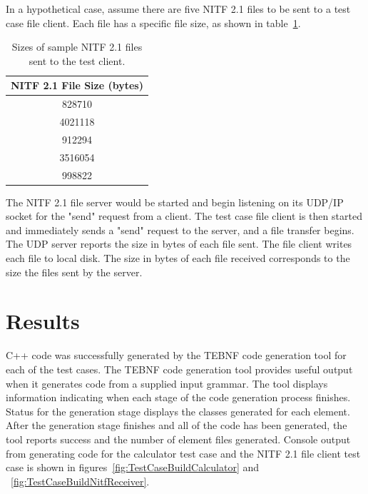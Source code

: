 \indent
In a hypothetical case, assume there are five NITF 2.1 files to be sent to a test case file client.  Each file has a specific file size, as shown in table~\ref{sampleNitfSizeServerData}.

\begin{table}[h]
\begin{center}
\caption{Sizes of sample NITF 2.1 files sent to the test client.}
\label{sampleNitfSizeServerData}
\begin{tabular}{|c|} \hline
\textbf{NITF 2.1 File Size (bytes)} \\ \hline \hline
828710 \\ \hline
4021118 \\ \hline
912294 \\ \hline
3516054 \\ \hline
998822 \\ \hline                                  
\end{tabular}
\end{center}
\end{table}

\indent
The NITF 2.1 file server would be started and begin listening on its UDP/IP socket for the "send" request from a client.  The test case file client is then started and immediately sends a "send" request to the server, and a file transfer begins.  The UDP server reports the size in bytes of each file sent.  The file client writes each file to local disk.  The size in bytes of each file received corresponds to the size the files sent by the server.

\section{Results}
C++ code was successfully generated by the TEBNF code generation tool for each of the test cases.  The TEBNF code generation tool provides useful output when it generates code from a supplied input grammar.  The tool displays information  indicating when each stage of the code generation process finishes.  Status for the generation stage displays the classes generated for each element.  After the  generation stage finishes and all of the code has been generated, the tool reports success and the number of element files generated.  Console output from generating code for the calculator test case and the NITF 2.1 file client test case is shown in figures~\ref{fig:TestCaseBuildCalculator} and ~\ref{fig:TestCaseBuildNitfReceiver}.

